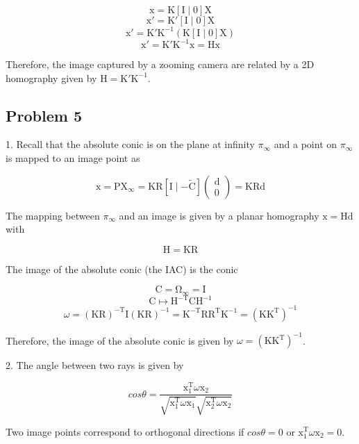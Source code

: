 \documentclass[conference]{IEEEtran}
\begin{document}
\[ \mathrm{x} = \mathrm{K}[\mathrm{I}\mid\mathrm{0}]\mathrm{X} \]
\[ \mathrm{x}{'} = \mathrm{K}{'}[\mathrm{I}\mid\mathrm{0}]\mathrm{X} \]
\[ \mathrm{x}{'} = \mathrm{K}{'}\mathrm{K}^{-1}(\mathrm{K}[\mathrm{I}\mid\mathrm{0}]\mathrm{X}) \]
\[ \mathrm{x}{'} = \mathrm{K}{'}\mathrm{K}^{-1}\mathrm{x} = \mathrm{H}\mathrm{x} \] 

Therefore, the image captured by a zooming camera are related by a 2D homography given by \( \mathrm{H} = \mathrm{K}{'}\mathrm{K}^{-1} \).

\clearpage

\subsection{Problem 5}

1. Recall that the absolute conic is on the plane at infinity \( \pi_\infty \) and a point on \( \pi_\infty \) is mapped to an image point as

\[ \mathrm{x} = \mathrm{P}\mathrm{X}_\infty = \mathrm{K}\mathrm{R}[\mathrm{I}\mid-\mathrm{\tilde{C}}]
\begin{pmatrix} \mathrm{d}\\0 \end{pmatrix} = \mathrm{K}\mathrm{R}\mathrm{d} \]

The mapping between \( \pi_\infty \) and an image is given by a planar homography \( \mathrm{x} = \mathrm{H}\mathrm{d} \) with 

\[ \mathrm{H} = \mathrm{K}\mathrm{R}\]

The image of the absolute conic (the IAC) is the conic

\[ \mathrm{C} = \mathrm{\Omega}_\mathrm{\infty} = \mathrm{I} \]
\[ \mathrm{C} \mapsto \mathrm{H}^\mathrm{-T}\mathrm{C}\mathrm{H}^{-1} \]
\[ \omega = (\mathrm{KR})^\mathrm{-T}\mathrm{I}(\mathrm{KR})^{-1} = 
\mathrm{K}^\mathrm{-T}\mathrm{R}\mathrm{R}^\mathrm{T}\mathrm{K}^{-1} = 
(\mathrm{K}\mathrm{K}^\mathrm{T})^{-1}\]

Therefore, the image of the absolute conic is given by \( \omega = (\mathrm{K}\mathrm{K}^\mathrm{T})^{-1} \).

2. The angle between two rays is given by 

\[ cos\theta = \frac{\mathrm{x}_1^\mathrm{T}\omega\mathrm{x}_2}
{\sqrt{\mathrm{x}_1^\mathrm{T}\omega\mathrm{x}_1}\sqrt{\mathrm{x}_2^\mathrm{T}\omega\mathrm{x}_2}} \]
 
Two image points correspond to orthogonal directions if \( cos\theta = 0 \) or \(\mathrm{x}_1^\mathrm{T}\omega\mathrm{x}_2 = 0\).
\end{document}
